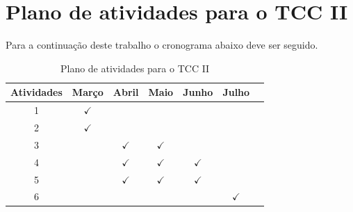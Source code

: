 \documentclass[	12pt, Times, openright, twoside, a4paper, english, brazil]{abntex2}
\begin{document}
  \chapter{Plano de atividades para o TCC II}
    Para a continuação deste trabalho o cronograma abaixo deve ser seguido.

    \begin{table}[!ht]
    	\centering
    		\caption{Plano de atividades para o TCC II}	\label{tab:plano}
    		\begin{tabular}{|c|c|c|c|c|c|c|}
    			\hline  \textbf{Atividades} &	\textbf{Março} &	\textbf{Abril} & \textbf{Maio} & \textbf{Junho} & \textbf{Julho} \\
    			\hline 1 & $\checkmark$ 	& & & & 	\\
    			\hline 2 & $\checkmark$	& & & & 	\\
    			\hline 3 & 	&$\checkmark$ &$\checkmark$ & & 	\\
    			\hline 4 & 	&$\checkmark$ &$\checkmark$ &$\checkmark$ & 	\\
    			\hline 5 & 	&$\checkmark$ &$\checkmark$ &$\checkmark$ & 	\\
                \hline 6 &  & & & &$\checkmark$ 	\\
    			\hline 
    		\end{tabular}
    \end{table}
\end{document}
